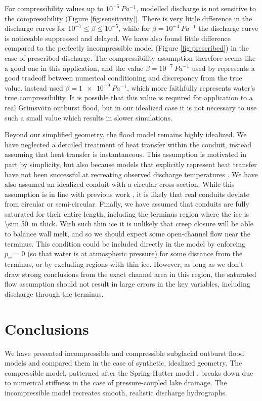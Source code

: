 \documentclass[11pt]{article}
\begin{document}
For compressibility values up to $10^{-5}\SI{}{Pa^{-1}}$, modelled discharge is not sensitive to the compressibility (Figure \ref{fig:sensitivity}). There is very little difference in the discharge curves for $10^{-7} \leq \beta \leq 10^{-5}$, while for $\beta = 10^{-4}\SI{}{Pa^{-1}}$ the discharge curve is noticeable suppressed and delayed. We have also found little difference compared to the perfectly incompressible model (Figure \ref{fig:prescribed}) in the case of prescribed discharge. The compressibility assumption therefore seems like a good one in this application, and the value $\beta = 10^{-7}\SI{}{Pa^{-1}}$ used by \citet{clarke2003} represents a good tradeoff between numerical conditioning and discrepancy from the true value. \citet{flowers2004} instead used $\beta = \SI{1e-9}{Pa^{-1}}$, which more faithfully represents water's true compressibility. It is possible that this value is required for application to a real Grimsv\"otn outburst flood, but in our idealized case it is not necessary to use such a small value which results in slower simulations.

Beyond our simplified geometry, the flood model remains highly idealized. We have neglected a detailed treatment of heat transfer within the conduit, instead assuming that heat transfer is instantaneous. This assumption is motivated in part by simplicity, but also because models that explicitly represent heat transfer \citep[e.g.][]{clarke2003} have not been successful at recreating observed discharge temperatures \citep{flowers2004}. We have also assumed an idealized conduit with a circular cross-section. While this assumption is in line with previous work \citep{rothlisberger1972, nye1976, spring1981, spring1982, clarke2003}, it is likely that real conduits deviate from circular or semi-circular. Finally, we have assumed that conduits are fully saturated for their entire length, including the terminus region where the ice is \SI{\sim 50}{m} thick. With such thin ice it is unlikely that creep closure will be able to balance wall melt, and so we should expect some open-channel flow near the terminus. This condition could be included directly in the model by enforcing $p_w = 0$ (so that water is at atmospheric pressure) for some distance from the terminus, or by excluding regions with thin ice. However, as long as we don't draw strong conclusions from the exact channel area in this region, the saturated flow assumption should not result in large errors in the key variables, including discharge through the terminus.

\section{Conclusions}
We have presented incompressible and compressible subglacial outburst flood models and compared them in the case of synthetic, idealized geometry. The compressible model, patterned after the Spring-Hutter model \citep{spring1981, spring1982}, breaks down due to numerical stiffness in the case of pressure-coupled lake drainage. The incompressible model \citep{clarke2003, flowers2004} recreates smooth, realistic discharge hydrographs.
\end{document}
